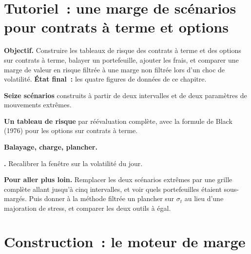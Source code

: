 \section{Tutoriel~: une marge de scénarios pour contrats à terme et options}\label{tut:m1:margin:span}

\begin{tutorial}
\textbf{Objectif.} Construire les tableaux de risque des contrats à terme et des options sur contrats à terme, balayer
un portefeuille, ajouter les frais, et comparer une marge de valeur en risque filtrée à une marge non filtrée lors
d'un choc de volatilité. \textbf{État final~:} les quatre figures de données
de ce chapitre.
\begin{tutsteps}
\item \textbf{Seize scénarios} construits à partir de deux intervalles et de deux paramètres de
mouvements extrêmes.
\label{lst:m1:margin:scenarios}
\item \textbf{Un tableau de risque} par réévaluation complète, avec la formule de Black (1976)
pour les options sur contrats à terme.
\label{lst:m1:margin:array}
\item \textbf{Balayage, charge, plancher.}
\label{lst:m1:margin:product}
\item \textbf{.} Recalibrer la fenêtre sur la volatilité du jour.
\label{lst:m1:margin:fhs}
\end{tutsteps}
\textbf{Pour aller plus loin.} Remplacer les deux scénarios extrêmes par une grille complète
allant jusqu'à cinq intervalles, et voir quels portefeuilles étaient sous-margés. Puis donner
à la méthode filtrée un plancher sur $\sigma_t$ au lieu d'une majoration de stress,
et comparer les deux outils à  égal.
\end{tutorial}

\section{Construction~: le moteur de marge}\label{bld:m1:margin:engine}


